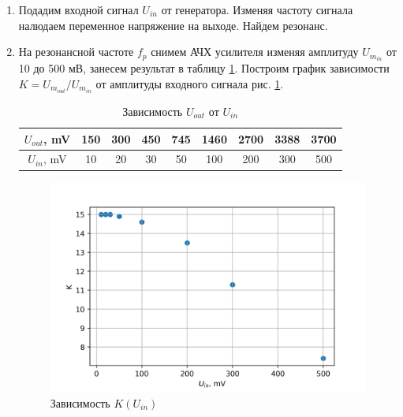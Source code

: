 \documentclass[a4paper]{article}
\begin{document}
\begin{enumerate}
    \item Подадим входной сигнал $U_{in}$ от генератора. Изменяя частоту сигнала налюдаем переменное напряжение на выходе. Найдем резонанс. \par
    \begin{center}
    \end{center} 

    \item На резонансной частоте $f_p$ снимем АЧХ усилителя изменяя амплитуду $U_{m_{in}}$ от 10 до 500 мВ, занесем результат в таблицу \ref{t1}. Построим график зависимости 
    $K = U_{m_{out}}/ U_{m_{in}}$ от амплитуды входного сигнала рис. \ref{gr1}.

    \begin{table}[H]
        \centering
        \begin{center}
        \end{center}
        \vspace{0.1cm}
        \begin{tabular}{|c|c|c|c|c|c|c|c|c|}
            \hline
            $U_{out}$, mV  & 150  & 300&450 & 745& 1460& 2700&3388 & 3700  \\ 
            \hline
            $U_{in}$, mV   & 10 &  20 &  30 &50& 100&200 & 300 &  500  \\
            \hline
            \end{tabular}
            \caption{Зависимость $U_{out}$  от $U_{in}$}
            \label{t1}
    \end{table}

    \begin{figure}[H]
        \begin{center}
            \includegraphics[scale = 1]{gr1.png}
            \caption{Зависимость $K(U_{in})$}
            \label{gr1}
        \end{center}
    \end{figure}



\end{enumerate}
\end{document}
